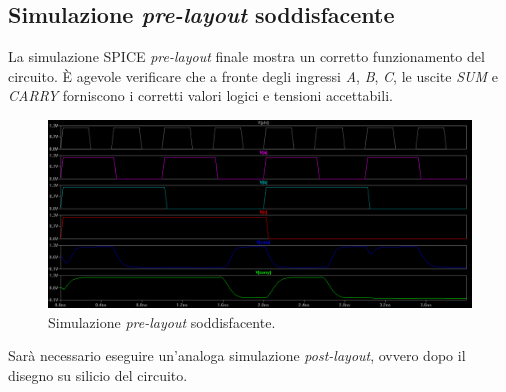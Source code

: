 \subsection{Simulazione \textit{pre-layout} soddisfacente}
La simulazione SPICE \textit{pre-layout} finale mostra un corretto funzionamento del circuito. \MakeUppercase{è} agevole verificare che a fronte degli ingressi \textit{A}, \textit{B}, \textit{C}, le uscite \textit{SUM} e \textit{CARRY} forniscono i corretti valori logici e tensioni accettabili.

\begin{figure}[hbt!]
	\centering
	\includegraphics[width=1\textwidth]{figure/sim_FA_Good.png}
	\caption{Simulazione \textit{pre-layout} soddisfacente.}
	\label{fig:simulazionePreLayoutSoddisfacente}
\end{figure}

Sarà necessario eseguire un'analoga simulazione \textit{post-layout}, ovvero dopo il disegno su silicio del circuito.
